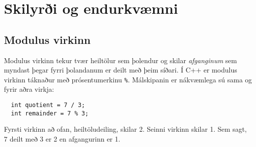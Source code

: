 





\chapter{Skilyrði og endurkvæmni}
\label{condrecursion}

\section{Modulus virkinn}

Modulus virkinn tekur tvær heiltölur sem þolendur og skilar {\em afganginum} sem myndast þegar fyrri þolandanum er deilt með þeim síðari.
Í C++ er modulus virkinn táknaður með prósentumerkinu {\tt \%}.
Málskipanin er nákvæmlega sú sama og fyrir aðra virkja: 

\begin{verbatim}
  int quotient = 7 / 3;
  int remainder = 7 % 3;
\end{verbatim}
%
Fyrsti virkinn að ofan, heiltöludeiling, skilar 2.
Seinni virkinn skilar 1.
Sem sagt, 7 deilt með 3 er 2 en afgangurinn er 1.

